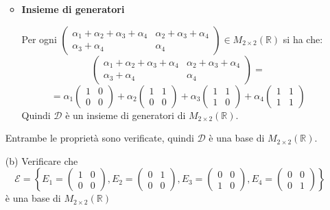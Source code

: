 \documentclass[a4paper]{article}
\theoremstyle{break}
\theoremstyle{break}
\theoremstyle{break}
\theoremstyle{break}
\begin{document}
\begin{enumerate}
\begin{itemize}
          \item \textbf{Insieme di generatori}

            \noindent Per ogni \( \begin{pmatrix} 
              \alpha_1 + \alpha_2 + \alpha_3 + \alpha_4 & \alpha_2 + \alpha_3 + \alpha_4\\
              \alpha_3 + \alpha_4 & \alpha_4
            \end{pmatrix} \in M_{2 \times 2}(\mathbb{R}) \) si ha che:
            \[
              \begin{pmatrix} 
                \alpha_1 + \alpha_2 + \alpha_3 + \alpha_4 & \alpha_2 + \alpha_3 + \alpha_4\\
                \alpha_3 + \alpha_4 & \alpha_4
              \end{pmatrix} = 
            \]
            \[
              =
              \alpha_1 \begin{pmatrix} 
                1 & 0\\
                0 & 0
              \end{pmatrix}
              +
              \alpha_2 \begin{pmatrix} 
                1 & 1\\
                0 & 0
              \end{pmatrix}
              +
              \alpha_3 \begin{pmatrix} 
                1 & 1\\
                1 & 0
              \end{pmatrix}
              +
              \alpha_4 \begin{pmatrix} 
                1 & 1\\
                1 & 1
              \end{pmatrix}
            \]
            Quindi \( \mathcal{D} \) è un insieme di generatori di \( M_{2 \times 2}(\mathbb{R}) \).
        \end{itemize}
        Entrambe le proprietà sono verificate, quindi \( \mathcal{D} \) è una base di \( M_{2 \times 2}(\mathbb{R}) \).

	\item[(b)] Verificare che
	      \[
		      \mathcal{E} = \left\{
		      E_1 = \begin{pmatrix}
			      1 & 0 \\
			      0 & 0
		      \end{pmatrix} ,
		      E_2 = \begin{pmatrix}
			      0 & 1 \\
			      0 & 0
		      \end{pmatrix} ,
		      E_3 = \begin{pmatrix}
			      0 & 0 \\
			      1 & 0
		      \end{pmatrix} ,
		      E_4 = \begin{pmatrix}
			      0 & 0 \\
			      0 & 1
		      \end{pmatrix}
		      \right\}
	      \]
	      è una base di \( M_{2 \times 2}(\mathbb{R}) \)


\end{enumerate}
\end{document}
